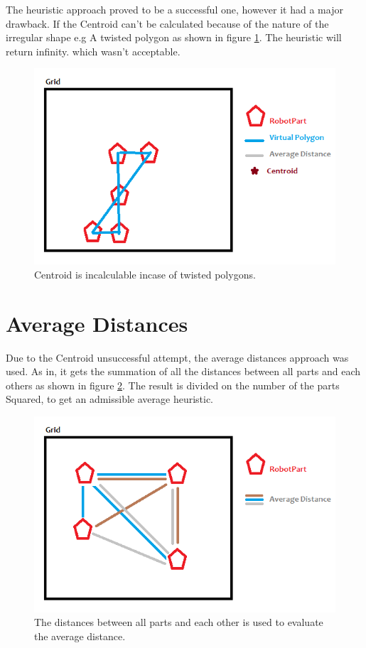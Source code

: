 The heuristic approach proved to be a successful one, however it had a major drawback. If the Centroid can't be calculated because of the nature of the irregular shape e.g A twisted polygon as shown in figure \ref{fig:twistedcentroid}. The heuristic will return infinity. which wasn't acceptable. 

\begin{figure}[H] 
   	\centering
	\includegraphics[scale=0.6]{images/twistedcentroid} 
    \caption{Centroid is incalculable incase of twisted polygons. }
    \label{fig:twistedcentroid} 
\end{figure}


\section{Average Distances}

Due to the Centroid unsuccessful attempt, the average distances approach was used. As in, it gets the summation of all the distances between all parts and each others as shown in figure \ref{fig:averagedistance}. The result is divided on the number of the parts Squared, to get an admissible average heuristic.

\begin{figure}[H] 
   	\centering
	\includegraphics[scale=0.6]{images/averagedistance} 
    \caption{The distances between all parts and each other is used to evaluate the average distance. }
    \label{fig:averagedistance} 
\end{figure}

